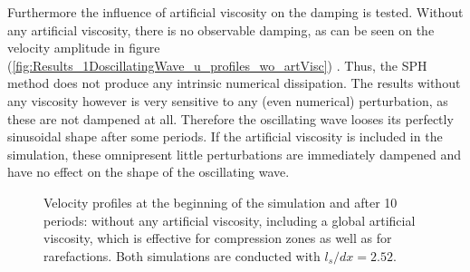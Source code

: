 \documentclass{report}
\begin{document}
Furthermore the influence of artificial viscosity on the damping is tested. Without any artificial viscosity, there is no observable damping, as can be seen on the velocity amplitude in figure (\ref{fig:Results_1DoscillatingWave_u_profiles_wo_artVisc}) . Thus, the SPH method does not produce any intrinsic numerical dissipation. The results without any viscosity however is very sensitive to any (even numerical) perturbation, as these are not dampened at all. Therefore the oscillating wave looses its perfectly sinusoidal shape after some periods. If the artificial viscosity is included in the simulation, these omnipresent little perturbations are immediately dampened and have no effect on the shape of the oscillating wave.

\begin{figure}[h]
 \label{fig:Results_1DoscillatingWave_u_profiles}
\centering
{}
\caption[Velocity profiles 1D oscillation]{Velocity profiles at the beginning of the simulation and after 10 periods:  without any artificial viscosity,  including a global artificial viscosity, which is effective for compression zones as well as for rarefactions. Both simulations are conducted with $l_s/dx=2.52$.}

\end{figure}
\end{document}
